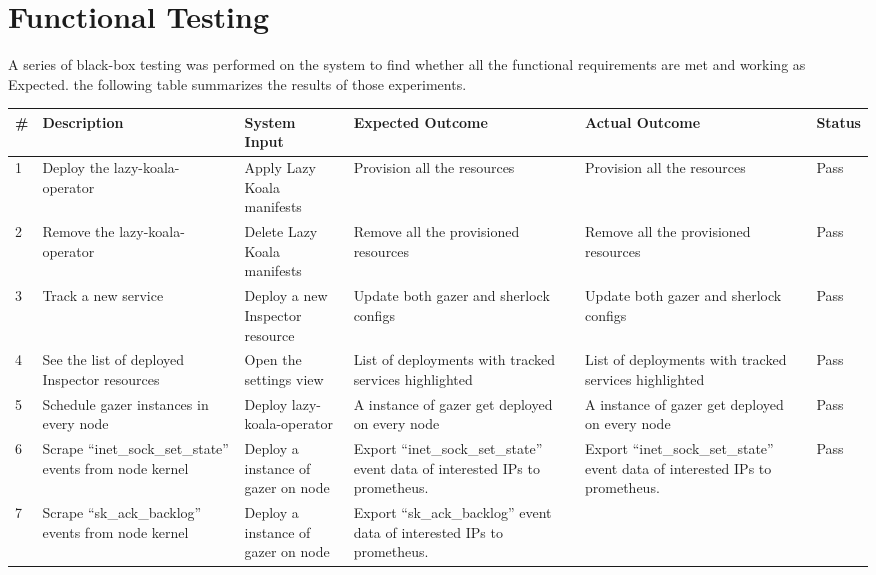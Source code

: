 \section{Functional Testing}

A series of black-box testing was performed on the system to find whether all the functional requirements are met and working as Expected. the following table summarizes the results of those experiments. 

\begin{longtable}{|p{3mm}|p{30mm}|p{27mm}|p{33mm}|p{33mm}|p{10mm}|}
    \hline
    \textbf{\#} &
      \textbf{Description} &
      \textbf{System Input} &
      \textbf{Expected Outcome} &
      \textbf{Actual Outcome} &
      \textbf{Status} \\ \hline
    1 &
      Deploy the \ac{lazy-koala-operator} &
      Apply Lazy Koala manifests &
      Provision all the resources &
      Provision all the resources &
      Pass \\ \hline
    2 &
      Remove the \ac{lazy-koala-operator} &
      Delete Lazy Koala manifests &
      Remove all the provisioned resources &
      Remove all the provisioned resources &
      Pass \\ \hline
    3 &
      Track a new service &
      Deploy a new Inspector resource &
      Update both \ac{gazer} and \ac{sherlock} configs &
      Update both \ac{gazer} and \ac{sherlock} configs &
      Pass \\ \hline
    4 &
      See the list of deployed Inspector resources &
      Open the settings view &
      List of deployments with tracked services highlighted &
      List of deployments with tracked services highlighted &
      Pass \\ \hline
    5 &
      Schedule \ac{gazer} instances in every node &
      Deploy \ac{lazy-koala-operator} &
      A instance of \ac{gazer} get deployed on every node &
      A instance of \ac{gazer} get deployed on every node &
      Pass \\ \hline
    6 &
      Scrape “inet\_sock\_set\_state” events from node kernel &
      Deploy a instance of \ac{gazer} on node &
      Export “inet\_sock\_set\_state” event data of interested IPs to prometheus. &
      Export “inet\_sock\_set\_state” event data of interested IPs to prometheus. &
      Pass \\ \hline
    7 &
      Scrape “sk\_ack\_backlog” events from node kernel &
      Deploy a instance of \ac{gazer} on node &
      Export “sk\_ack\_backlog” event data of interested IPs to prometheus. &

\end{longtable}
